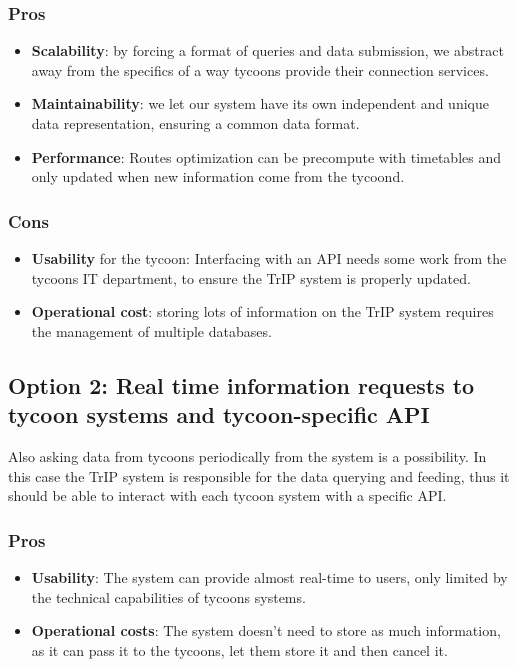 \subsubsection*{Pros}
\begin{itemize}[noitemsep]
    \item \textbf{Scalability}: by forcing a format of queries and data submission, we abstract away from the specifics of a way tycoons provide their connection services.
    \item \textbf{Maintainability}: we let our system have its own independent and unique data representation, ensuring a common data format.
    \item \textbf{Performance}: Routes optimization can be precompute with timetables and only updated when new information come from the tycoond.
\end{itemize}
\subsubsection*{Cons}
\begin{itemize}[noitemsep]
    \item \textbf{Usability} for the tycoon: Interfacing with an API needs some work from the tycoons IT department, to ensure the TrIP system is properly updated.
    \item \textbf{Operational cost}: storing lots of information on the TrIP system requires the management of multiple databases.
\end{itemize}


\subsection*{Option 2: Real time information requests to tycoon systems and tycoon-specific API}
Also asking data from tycoons periodically from the system is a possibility. In this case the TrIP system is
responsible for the data querying and feeding, thus it should be able to interact with each tycoon system with a specific API.
\subsubsection*{Pros}
\begin{itemize}[noitemsep]
    \item \textbf{Usability}: The system can provide almost real-time to users, only limited by the technical capabilities of tycoons systems.
    \item \textbf{Operational costs}: The system doesn't need to store as much information, as it can pass it to the tycoons, let them store it and then cancel it.
\end{itemize}

